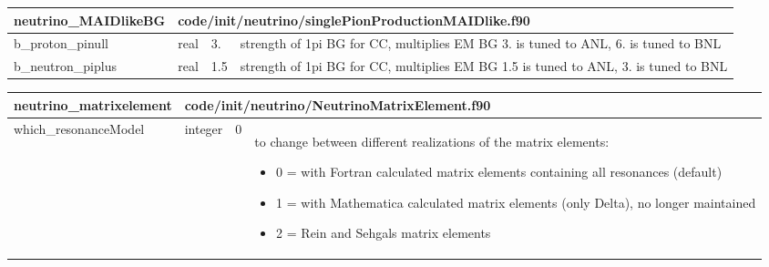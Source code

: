 \documentclass{article}
\begin{document}
\begin{longtable}{llll}
\toprule
\textbf{\large{neutrino\_MAIDlikeBG}} & \multicolumn{3}{l}{\footnotesize{code/init/neutrino/singlePionProductionMAIDlike.f90}}\\*
\midrule
\endfirsthead
\midrule
\endhead
b\_proton\_pinull & \begin{minipage}[t]{2cm}real\end{minipage} & \begin{minipage}[t]{2cm}3.\end{minipage} & \begin{minipage}[t]{12cm}strength of 1pi BG for CC, multiplies EM BG 3. is  tuned to ANL, 6. is tuned to BNL\end{minipage}\\*
\midrule
b\_neutron\_piplus & \begin{minipage}[t]{2cm}real\end{minipage} & \begin{minipage}[t]{2cm}1.5\end{minipage} & \begin{minipage}[t]{12cm}strength of 1pi BG for CC, multiplies EM BG 1.5 is tuned to ANL, 3. is tuned to BNL\end{minipage}\\*
\bottomrule
\end{longtable}
{ }




\begin{longtable}{llll}
\toprule
\textbf{\large{neutrino\_matrixelement}} & \multicolumn{3}{l}{\footnotesize{code/init/neutrino/NeutrinoMatrixElement.f90}}\\*
\midrule
\endfirsthead
\midrule
\endhead
which\_resonanceModel & \begin{minipage}[t]{2cm}integer\end{minipage} & \begin{minipage}[t]{2cm}0\end{minipage} & \begin{minipage}[t]{12cm}to change between different realizations of the matrix elements:\begin{itemize}\leftmargin0em\itemindent0pt\item 0 = with Fortran calculated matrix elements containing all resonances (default)\item 1 = with Mathematica calculated matrix elements (only Delta), no longer maintained\item 2 = Rein and Sehgals matrix elements\end{itemize}\end{minipage}\\*
\bottomrule
\end{longtable}
{ }
\end{document}
